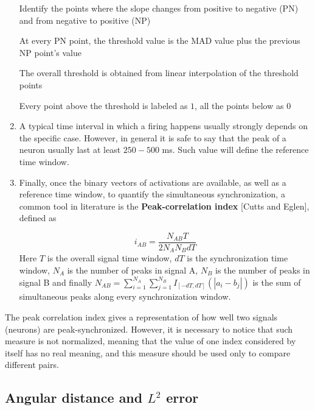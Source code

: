 \documentclass[a4paper]{article}
\begin{document}
\begin{enumerate}
\begin{algorithm}
\begin{algorithmic}[1]
			\State Identify the points where the slope changes from positive to negative (PN) and from negative to positive (NP)
			
			
			\State At every PN point, the threshold value is the MAD value plus the previous NP point's value
			
			\State The overall threshold is obtained from linear interpolation of the threshold points
			
			\State Every point above the threshold is labeled as $1$, all the points below as $0$
		\end{algorithmic}
	\end{algorithm}
	
	\item A typical time interval in which a firing happens usually strongly depends on the specific case. However, in general it is safe to say that the peak of a neuron usually last at least $250-500$ ms. Such value will define the reference time window. 
	
	\item Finally, once the binary vectors of activations are available, as well as a reference time window, to quantify the simultaneous synchronization, a common tool in literature is the \textbf{Peak-correlation index} [Cutts and Eglen], defined as 
	
	$$ i_{AB} = \frac{N_{AB} T}{2 N_A N_B dT} $$ 
	Here $T $ is the overall signal time window, $dT$ is the synchronization time window, $N_A$ is the number of peaks in signal A, $N_B $ is the number of peaks in signal B and finally $N_{AB} = \sum_{i=1}^{N_A} \sum_{j=1}^{N_B} I_{[-dT,dT]}(|a_i - b_j|) $ is the sum of simultaneous peaks along every synchronization window.
	
\end{enumerate}

The peak correlation index gives a representation of how well two signals (neurons) are peak-synchronized. However, it is necessary to notice that such measure is not normalized, meaning that the value of one index considered by itself has no real meaning, and this measure should be used only to compare different pairs.


\subsection{Angular distance and $L^2$ error}
\end{document}
